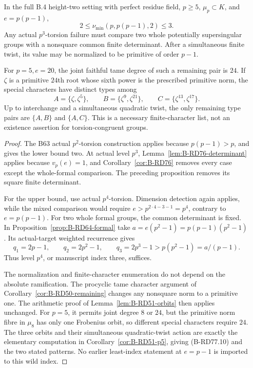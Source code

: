 \begin{corollary}[Two remaining patterns at \(p=5,e=20\)]
\label{cor:B-RD77}
In the full B.4 height-two setting with perfect residue field,
\(p\ge5\), \(\mu_p\subset K\), and \(e=p(p-1)\),
\[
                    2\le\nu_{\min}(p,p(p-1),2)\le3.
                                                        \tag{B-RD77.9}
\]
Any actual \(p^3\)-torsion failure must compare two whole
potentially supersingular groups with a nonsquare common finite
determinant. After a simultaneous finite twist, its value may
be normalized to be primitive of order \(p-1\).

For \(p=5,e=20\), the joint faithful tame degree of such a
remaining pair is \(24\). If \(\zeta\) is a primitive
\(24\)th root whose sixth power is the prescribed primitive
norm, the special characters have distinct types among
\[
 A=\{\zeta,\zeta^5\},\qquad
 B=\{\zeta^9,\zeta^{21}\},\qquad
 C=\{\zeta^{13},\zeta^{17}\}.                         \tag{B-RD77.10}
\]
Up to interchange and a simultaneous quadratic twist, the only
remaining type pairs are \(\{A,B\}\) and \(\{A,C\}\).
This is a necessary finite-character list, not an existence
assertion for torsion-congruent groups.
\end{corollary}
\begin{proof}
The B63 actual \(p^2\)-torsion construction applies because
\(p(p-1)>p\), and gives the lower bound two. At actual level
\(p^3\), Lemma~\ref{lem:B-RD76-determinant} applies because
\(v_p(e)=1\), and Corollary~\ref{cor:B-RD76} removes every
case except the whole-formal comparison. The preceding proposition
removes its square finite determinant.

For the upper bound, use actual \(p^4\)-torsion. Dimension
detection again applies, while the mixed comparison would require
\(e>p^{2\cdot4-3-1}=p^4\), contrary to \(e=p(p-1)\).
For two whole formal groups, the common determinant is fixed.
In Proposition~\ref{prop:B-RD64-formal} take
\(a=e(p^2-1)=p(p-1)(p^2-1)\). Its actual-target weighted
recurrence gives
\[
 q_1=2p-1,\qquad q_2=2p^2-1,\qquad q_3=2p^3-1
                  >p(p^2-1)=a/(p-1).                \tag{B-RD77.11}
\]
Thus level \(p^4\), or manuscript index three, suffices.

The normalization and finite-character enumeration do not
depend on the absolute ramification. The procyclic tame
character argument of Corollary~\ref{cor:B-RD50-remaining}
changes any nonsquare norm to a primitive one. The arithmetic
proof of Lemma~\ref{lem:B-RD51-orbits} then applies unchanged.
For \(p=5\), it permits joint degree \(8\) or \(24\), but
the primitive norm fibre in \(\mu_8\) has only one Frobenius
orbit, so different special characters require \(24\).
The three orbits and their simultaneous quadratic-twist action
are exactly the elementary computation in
Corollary~\ref{cor:B-RD51-p5}, giving (B-RD77.10) and the two
stated patterns. No earlier least-index statement at \(e=p-1\)
is imported to this wild index.
\end{proof}

